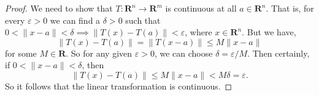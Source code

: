 \begin{questions}

\begin{solution}
\begin{proof}
    We need to show that $T:\mathbf{R}^n\to\mathbf{R}^m$ is continuous at all $a\in \mathbf{R}^n$. That is, for every $\varepsilon>0$ we can find a $\delta>0$ such that $0<\|x-a\|<\delta\implies\|T(x)-T(a)\|<\varepsilon$, where $x\in \mathbf{R}^n$. But we have,
    $$\|T(x)-T(a)\| = \|T(x-a)\|\le M\|x-a\|$$
    for some $M\in\mathbf{R}$. So for any given $\varepsilon>0$, we can choose $\delta=\varepsilon/M$. Then certainly, if $0<\|x-a\|<\delta$, then
    $$\|T(x)-T(a)\|\le M\|x-a\|< M\delta=\varepsilon.$$
    So it follows that the linear transformation is continuous.
\end{proof}
\end{solution}

\end{questions}